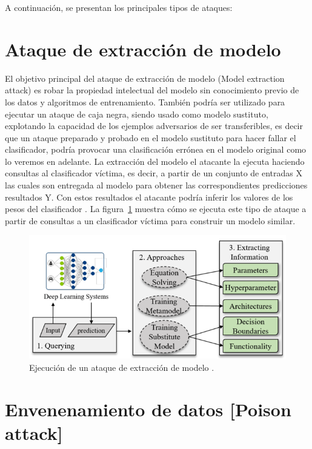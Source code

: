 A continuación, se presentan los principales tipos de ataques:




\section{Ataque de extracción de modelo}

El objetivo principal del ataque de extracción de modelo (Model extraction attack) es robar la propiedad intelectual del modelo sin conocimiento previo de los datos y algoritmos de entrenamiento. También podría ser utilizado para ejecutar un ataque de caja negra, siendo usado como modelo sustituto, explotando la capacidad de los ejemplos adversarios de ser transferibles, es decir que un ataque preparado y probado en el modelo sustituto para hacer fallar el clasificador, podría provocar una clasificación errónea en el modelo original \parencite{r9} como lo veremos en adelante. La extracción del modelo el atacante la ejecuta haciendo consultas al clasificador víctima, es decir, a partir de un conjunto de entradas X las cuales son entregada al modelo para obtener las correspondientes predicciones resultados Y. Con estos resultados el atacante podría inferir los valores de los pesos del clasificador \parencite{r33}. La figura~\ref{fig:14} muestra cómo se ejecuta este tipo de ataque a partir de consultas a un clasificador víctima para construir un modelo similar.


\begin{figure}[th]
\centering
\includegraphics[scale = 0.9]{Figures/figura_14.PNG}
\decoRule
\caption[ ataque de extracción]{Ejecución de un ataque de extracción de modelo \parencite{r32}.}
\label{fig:14}
\end{figure}




\section{Envenenamiento de datos [Poison attack]}

